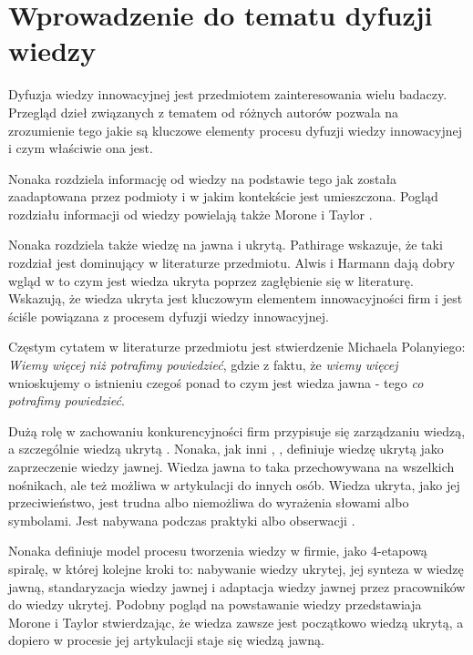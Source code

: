 \section{Wprowadzenie do tematu dyfuzji wiedzy}

Dyfuzja wiedzy innowacyjnej jest przedmiotem zainteresowania
wielu badaczy. Przegląd dzieł związanych z tematem od różnych
autorów pozwala na zrozumienie tego jakie są kluczowe elementy
procesu dyfuzji wiedzy innowacyjnej i czym właściwie ona jest.

Nonaka \cite{No-98} rozdziela informację od wiedzy na podstawie
tego jak została zaadaptowana przez podmioty i w jakim
kontekście jest umieszczona. Pogląd rozdziału informacji
od wiedzy powielają także Morone i Taylor \cite{Mo-Ta-09}.

Nonaka \cite{No-98} rozdziela także wiedzę na jawna i ukrytą.
Pathirage \cite{Pa-08} wskazuje, że taki rozdział jest dominujący 
w literaturze przedmiotu. Alwis i Harmann \cite{Al-Ha-08} dają dobry 
wgląd w to czym jest wiedza ukryta poprzez zagłębienie się 
w literaturę. Wskazują, że wiedza ukryta jest kluczowym 
elementem innowacyjności firm i jest ściśle powiązana z 
procesem dyfuzji wiedzy innowacyjnej.

Częstym cytatem w literaturze przedmiotu jest stwierdzenie
Michaela Polanyiego: \textit{Wiemy więcej niż potrafimy powiedzieć},
gdzie z faktu, że \textit{wiemy więcej} wnioskujemy o istnieniu czegoś
ponad to czym jest wiedza jawna - tego \textit{co potrafimy powiedzieć}.

Dużą rolę w zachowaniu konkurencyjności firm przypisuje się
zarządzaniu wiedzą, a szczególnie wiedzą ukrytą \cite{No-98}.
Nonaka, jak inni \cite{Mo-16}, \cite{Ga-Th-14}, definiuje wiedzę ukrytą
jako zaprzeczenie wiedzy jawnej. Wiedza jawna to taka
przechowywana na wszelkich nośnikach, ale też możliwa w artykulacji
do innych osób. Wiedza ukryta, jako jej przeciwieństwo,
jest trudna albo niemożliwa do wyrażenia słowami albo symbolami.
Jest nabywana podczas praktyki albo obserwacji \cite{No-98}.

Nonaka \cite{No-98} definiuje model procesu tworzenia wiedzy w firmie, 
jako 4-etapową spiralę, w której kolejne kroki to: nabywanie wiedzy
ukrytej, jej synteza w wiedzę jawną, standaryzacja wiedzy jawnej
i adaptacja wiedzy jawnej przez pracowników do wiedzy ukrytej.
Podobny pogląd na powstawanie wiedzy przedstawiaja Morone i 
Taylor \cite{Mo-Ta-09} stwierdzając, że wiedza zawsze jest początkowo
wiedzą ukrytą, a dopiero w procesie jej artykulacji staje się
wiedzą jawną.

